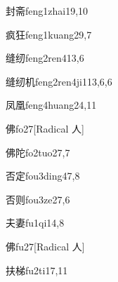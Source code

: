 \begin{verbete}{封斋}{feng1zhai1}{9,10}
\end{verbete}

\begin{verbete}{疯狂}{feng1kuang2}{9,7}
\end{verbete}

\begin{verbete}{缝纫}{feng2ren4}{13,6}
\end{verbete}

\begin{verbete}{缝纫机}{feng2ren4ji1}{13,6,6}
\end{verbete}

\begin{verbete}{凤凰}{feng4huang2}{4,11}
\end{verbete}

\begin{verbete}{佛}{fo2}{7}[Radical 人]
\end{verbete}

\begin{verbete}{佛陀}{fo2tuo2}{7,7}
\end{verbete}

\begin{verbete}{否定}{fou3ding4}{7,8}
\end{verbete}

\begin{verbete}{否则}{fou3ze2}{7,6}
\end{verbete}

\begin{verbete}{夫妻}{fu1qi1}{4,8}
\end{verbete}

\begin{verbete}{佛}{fu2}{7}[Radical 人]
\end{verbete}

\begin{verbete}{扶梯}{fu2ti1}{7,11}
\end{verbete}

